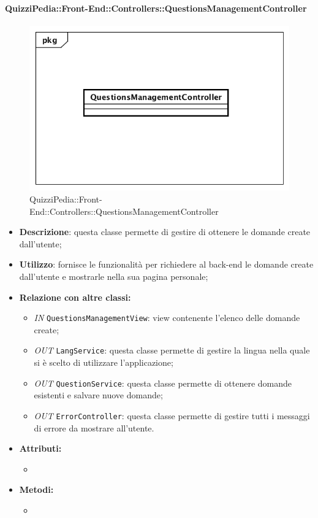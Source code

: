 \paragraph{QuizziPedia::Front-End::Controllers::QuestionsManagementController}
\begin{figure}
	\centering
	\includegraphics[scale=0.45]{UML/Classi/Front-End/QuizziPedia_Front-end_Controller_QuestionsManagementController.png}
	\caption{QuizziPedia::Front-End::Controllers::QuestionsManagementController}
\end{figure}
\begin{itemize}
	\item \textbf{Descrizione}: questa classe permette di gestire di ottenere le domande create dall'utente;
	\item \textbf{Utilizzo}: fornisce le funzionalità per richiedere al back-end le domande create dall'utente e mostrarle nella sua pagina personale; 
	\item \textbf{Relazione con altre classi:}
	\begin{itemize}
		\item \textit{IN} \texttt{QuestionsManagementView}: view contenente l'elenco delle domande create; 
		\item \textit{OUT} \texttt{LangService}: questa classe permette di gestire la lingua nella quale si è scelto di utilizzare l'applicazione;
		\item \textit{OUT} \texttt{QuestionService}: questa classe permette di ottenere domande esistenti e salvare nuove domande;
		\item \textit{OUT} \texttt{ErrorController}: questa classe permette di gestire tutti i messaggi di errore da mostrare all'utente.
	\end{itemize}
	\item \textbf{Attributi:}
	\begin{itemize}
		\item 
	\end{itemize}
	\item \textbf{Metodi:}
	\begin{itemize}
		\item 
	\end{itemize}
\end{itemize}

